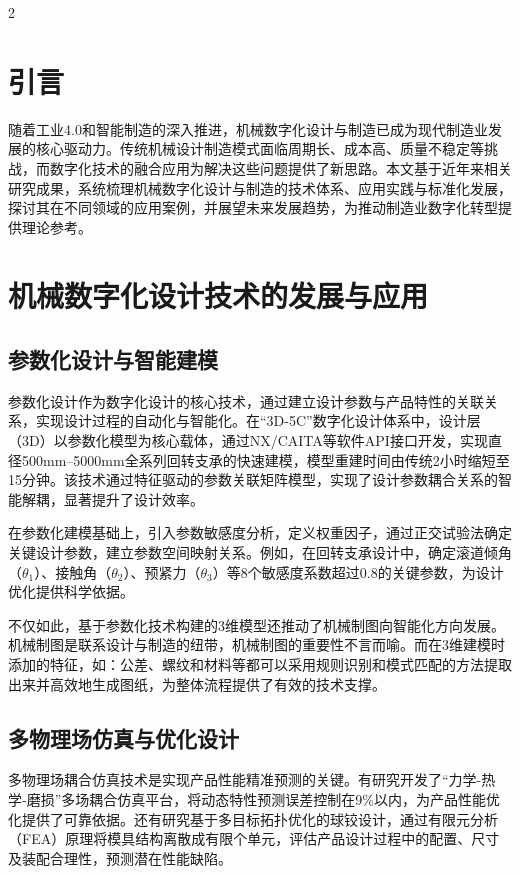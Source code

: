 \documentclass[fontset=windows,12pt,UTF8]{ctexart}
\begin{document}
\begin{multicols}{2}

	\section{引言}

	随着工业4.0和智能制造的深入推进，机械数字化设计与制造已成为现代制造业发展的核心驱动力。传统机械设计制造模式面临周期长、成本高、质量不稳定等挑战，而数字化技术的融合应用为解决这些问题提供了新思路。本文基于近年来相关研究成果，系统梳理机械数字化设计与制造的技术体系、应用实践与标准化发展，探讨其在不同领域的应用案例，并展望未来发展趋势，为推动制造业数字化转型提供理论参考。

	\section{机械数字化设计技术的发展与应用}

	\subsection{参数化设计与智能建模}

	参数化设计作为数字化设计的核心技术，通过建立设计参数与产品特性的关联关系，实现设计过程的自动化与智能化。在“3D-5C”数字化设计体系中，设计层（3D）以参数化模型为核心载体，通过NX/CAITA等软件API接口开发，实现直径500mm--5000mm全系列回转支承的快速建模，模型重建时间由传统2小时缩短至15分钟\cite{__2025-8}。该技术通过特征驱动的参数关联矩阵模型，实现了设计参数耦合关系的智能解耦，显著提升了设计效率。

	在参数化建模基础上，引入参数敏感度分析，定义权重因子，通过正交试验法确定关键设计参数，建立参数空间映射关系。例如，在回转支承设计中，确定滚道倾角（$\theta_1$）、接触角（$\theta_2$）、预紧力（$\theta_3$）等8个敏感度系数超过0.8的关键参数，为设计优化提供科学依据。

	不仅如此，基于参数化技术构建的3维模型还推动了机械制图向智能化方向发展\cite{__2025}。机械制图是联系设计与制造的纽带，机械制图的重要性不言而喻。而在3维建模时添加的特征，如：公差、螺纹和材料等都可以采用规则识别和模式匹配的方法提取出来并高效地生成图纸，为整体流程提供了有效的技术支撑。

	\subsection{多物理场仿真与优化设计}

	多物理场耦合仿真技术是实现产品性能精准预测的关键。有研究开发了“力学-热学-磨损”多场耦合仿真平台，将动态特性预测误差控制在9\%以内，为产品性能优化提供了可靠依据\cite{__2025-8}。还有研究基于多目标拓扑优化的球铰设计，通过有限元分析（FEA）原理将模具结构离散成有限个单元，评估产品设计过程中的配置、尺寸及装配合理性，预测潜在性能缺陷\cite{xin_digital_2023}。


\end{multicols}
\end{document}
